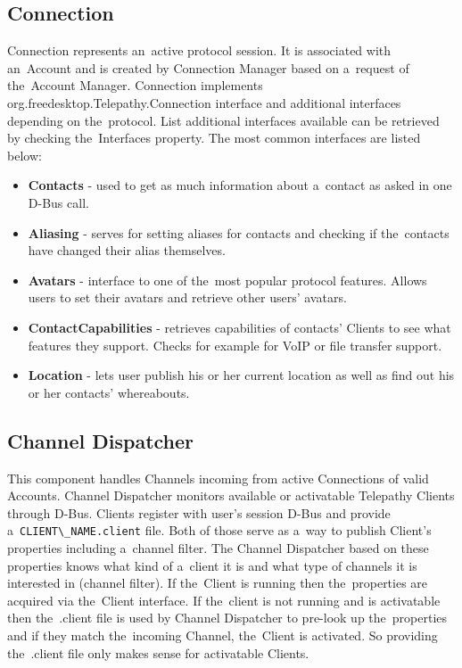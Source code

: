 \subsection*{Connection}
Connection represents an~active protocol session. It is associated with an~Account and is created by Connection Manager based on a~request of the~Account Manager. Connection implements org.freedesktop.Telepathy.Connection interface and additional interfaces depending on the~protocol. List additional interfaces available can be retrieved by checking the~Interfaces property. The most common interfaces are listed below\cite{TPWiki}:

\begin{itemize}

	\item {\bf Contacts} - used to get as much information about a~contact as asked in one D-Bus call.

	\item {\bf Aliasing} - serves for setting aliases for contacts and checking if the~contacts have changed their alias themselves. 

	\item {\bf Avatars} - interface to one of the~most popular protocol features. Allows users to set their avatars and retrieve other users' avatars.

	\item {\bf ContactCapabilities} - retrieves capabilities of contacts' Clients to see what features they support. Checks for example for VoIP or file transfer support.

	\item {\bf Location} - lets user publish his or her current location as well as find out his or her contacts' whereabouts. 

\end{itemize}


\subsection*{Channel Dispatcher}
This component handles Channels incoming from active Connections of valid Accounts. Channel Dispatcher monitors available or activatable Telepathy Clients through D-Bus. Clients register with user's session D-Bus and provide a~\verb|CLIENT\_NAME.client| file. Both of those serve as a~way to publish Client's properties including a~channel filter. The Channel Dispatcher based on these properties knows what kind of a~client it is and what type of channels it is interested in (channel filter). If the~Client is running then the~properties are acquired via the~Client interface. If the~client is not running and is activatable then the~.client file is used by Channel Dispatcher to pre-look up the~properties and if they match the~incoming Channel, the~Client is activated. So providing the~.client file only makes sense for activatable Clients.  

